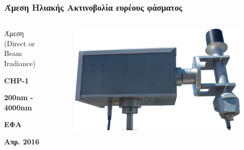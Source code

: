 \documentclass[hyperref={pdfpagelabels=false}]{beamer}
\newenvironment{topcolumns}{\begin{columns}[t]}{\end{columns}}
\begin{document}
\begin{frame}%
\frametitle{Άμεση Ηλιακής Ακτινοβολία ευρέους φάσματος}

\begin{topcolumns}%
    \column{5.5cm}
    \begin{block}{Άμεση (Direct or Beam Iradiance)}
        \begin{description}[leftmargin=0em]
            \item[Πυρηλιόμετρο:] \textbf{CHP-1}
            \item[Φάσμα:]        \textbf{200nm - 4000nm}
            \item[Ηλιοστάτης:]   \textbf{ΕΦΑ}
            \item[Λειτουργία:]   \textbf{Απρ. 2016}
        \end{description}
    \end{block}
    
    \column{5.5cm}
    \begin{figure}
        \includegraphics[width=1.0\textwidth]{files/P1110595e2.png}
    \end{figure}
    
\end{topcolumns}%

\end{frame}
\end{document}
